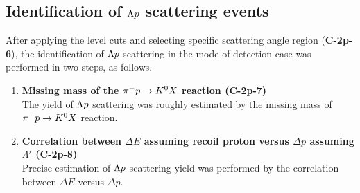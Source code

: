 \begin{comment}

\begin{figure}[!h]
  \begin{minipage}[t]{0.48\columnwidth}
    \centering
    \texttt{[image: costdp\_w.eps]}
    \caption{Correlation plot between the scattering angle of $\Lambda'$ in the CM frame ($\costcm$) versus $\Delta p$ assuming recoil proton in case \rom{2} with $\pM$ mode under {\bf C-2p-1, C-2p-2}, taken in E40 data. The red solid line represents the cut level {\bf C-2p-6}.}
    \label{fig-costdp_w}
  \end{minipage}
  \hspace{0.04\columnwidth} %
  \begin{minipage}[t]{0.48\columnwidth}
    \centering
    \texttt{[image: costdE\_w.eps]}
    \caption{Correlation plot between the scattering angle of $\Lambda'$ in the CM frame ($\costcm$) versus $\Delta E$ assuming recoil proton in case \rom{2} with $\pM$ mode under {\bf C-2p-1, C-2p-2}, taken in E40 data. The red solid line represents the cut level {\bf C-2p-6}.}
    \label{fig-costdE_w}
  \end{minipage}
\end{figure}

\end{comment}

\clearpage
\subsection{Identification of $\Lambda p$ scattering events}
\label{sec-2p_w_id}

After applying the  level cuts and selecting specific scattering angle region ({\bf C-2p-6}), the identification of $\Lambda p$ scattering in the  mode of detection case  was performed in two steps, as follows. 

\begin{enumerate}
  \item {\bf Missing mass of the $\pi^- p \to K^0 X$ reaction ({\bf C-2p-7}) } \\
  The yield of $\Lambda p$ scattering was roughly estimated by the missing mass of $\pi^- p \to K^0 X$ reaction.
  \item {\bf Correlation between $\Delta E$ assuming recoil proton versus $\Delta p$ assuming $\Lambda'$ ({\bf C-2p-8}) } \\
  Precise estimation of $\Lambda p$ scattering yield was performed by the correlation between $\Delta E$ versus $\Delta p$.
\end{enumerate}


